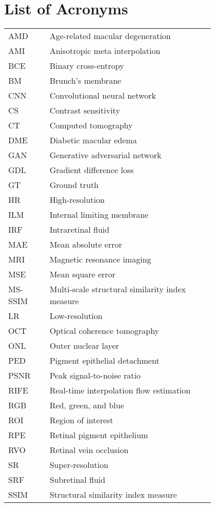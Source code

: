 \chapter*{List of Acronyms}

\begin{flushleft}
\begin{tabular}{l p{0.8\linewidth}}
	
AMD      & Age-related macular degeneration\\
AMI 	 & Anisotropic meta interpolation\\
BCE		 & Binary cross-entropy\\
BM   	 & Brunch's membrane\\
CNN      & Convolutional neural network\\
CS 		 & Contrast sensitivity\\
CT 		 & Computed tomography\\
DME      & Diabetic macular edema\\
GAN 	 & Generative adversarial network\\
GDL 	 & Gradient difference loss\\
GT  	 & Ground truth\\
HR 		 & High-resolution\\
ILM 	 & Internal limiting membrane\\
IRF      & Intraretinal fluid\\
MAE 	 & Mean absolute error\\
MRI 	 & Magnetic resonance imaging\\
MSE		 & Mean square error\\	
MS-SSIM  & Multi-scale structural similarity index measure\\
LR 		 & Low-resolution\\
OCT      & Optical coherence tomography\\
ONL      & Outer nuclear layer\\
PED      & Pigment epithelial detachment\\
PSNR 	 & Peak signal-to-noise ratio\\
RIFE	 & Real-time interpolation flow estimation\\
RGB 	 & Red, green, and blue\\
ROI		 & Region of interest\\
RPE      & Retinal pigment epithelium\\
RVO 	 & Retinal vein occlusion\\
SR		 & Super-resolution\\
SRF      & Subretinal fluid\\
SSIM 	 & Structural similarity index measure\\

\end{tabular}
\end{flushleft}

